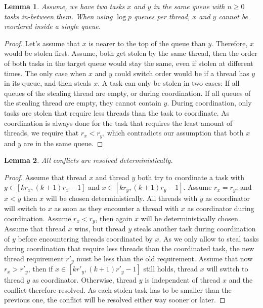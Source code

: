 \documentclass[preprint]{sigplanconf}
\newtheorem{lem}{Lemma}
\begin{document}
\begin{lem}
Assume, we have two tasks $x$ and $y$ in the same queue with $n\geq 0$
tasks in-between them. When using $\log p$ queues per thread, $x$ and
$y$ cannot be reordered inside a single queue.
\end{lem}

\begin{proof}
Let's assume that $x$ is nearer to the top of the queue than
$y$. Therefore, $x$ would be stolen first. Assume, both get stolen by
the same thread, then the order of both tasks in the target queue
would stay the same, even if stolen at different times. The only case
when $x$ and $y$ could switch order would be if a thread has $y$ in
its queue, and then steals $x$. A task can only be stolen in two
cases: If all queues of the stealing thread are empty, or during
coordination. If all queues of the stealing thread are empty, they
cannot contain $y$. During coordination, only tasks are stolen that
require less threads than the task to coordinate. As coordination is
always done for the task that requires the least amount of threads, we
require that $r_{x}<r_{y}$, which contradicts our assumption that both
$x$ and $y$ are in the same queue.
\end{proof}

\begin{lem}
All conflicts are resolved deterministically.
\end{lem}

\begin{proof}
Assume that thread $x$ and thread $y$ both try to coordinate a task
with $y \in [kr_{x},(k+1)r_{x}-1]$ and $x \in
[kr_{y},(k+1)r_{y}-1]$. Assume $r_{x}=r_{y}$, and $x<y$ then $x$ will
be chosen deterministically. All threads with $y$ as coordinator will
switch to $x$ as soon as they encounter a thread with $x$ as
coordinator during coordination. Assume $r_{x}<r_{y}$, then again $x$
will be deterministically chosen. Assume that thread $x$ wins, but
thread $y$ steals another task during coordination of $y$ before
encountering threads coordinated by $x$. As we only allow to steal
tasks during coordination that require less threads than the
coordinated task, the new thread requirement $r'_y$ must be less than
the old requirement. Assume that now $r_{x}>r'_{y}$, then if $x \in
[kr'_{y},(k+1)r'_{y}-1]$ still holds, thread $x$ will switch to thread
$y$ as coordinator. Otherwise, thread $y$ is independent of thread $x$
and the conflict therefore resolved. As each stolen task has to be
smaller than the previous one, the conflict will be resolved either
way sooner or later.
\end{proof}
\end{document}
